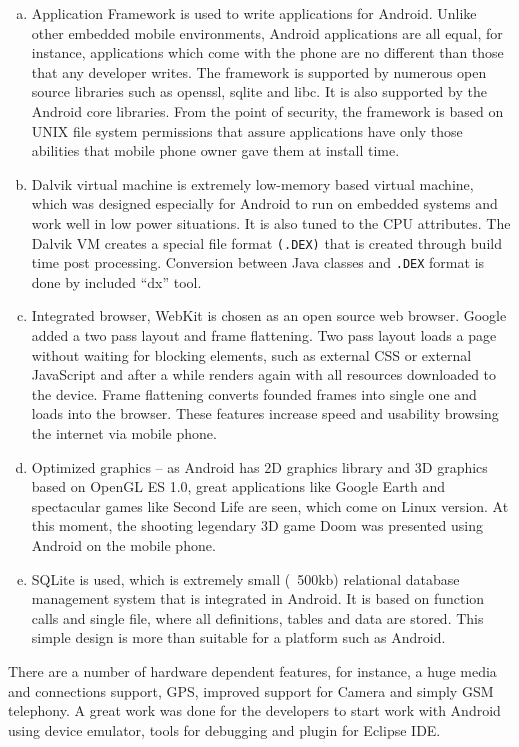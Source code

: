 \begin{enumerate}[a. ]
 \item Application Framework is used to write applications for Android. Unlike other
embedded mobile environments, Android applications are all equal, for instance,
applications which come with the phone are no different than those that any developer
writes. The framework is supported by numerous open source libraries such as
openssl, sqlite and libc. It is also supported by the Android core libraries. From the
point of security, the framework is based on UNIX file system permissions that assure
applications have only those abilities that mobile phone owner gave them at install
time.
 \item Dalvik virtual machine is extremely low-memory based virtual machine, which was
designed especially for Android to run on embedded systems and work well in low
power situations. It is also tuned to the CPU attributes. The Dalvik VM creates a
special file format \texttt{(.DEX)} that is created through build time post processing.
Conversion between Java classes and \texttt{.DEX} format is done by included “dx” tool.
 \item Integrated browser, WebKit is chosen as an open source web browser. Google added
a two pass layout and frame flattening. Two pass layout loads a page without waiting 
for blocking elements, such as external CSS or external JavaScript and after a while
renders again with all resources downloaded to the device. Frame flattening converts
founded frames into single one and loads into the browser. These features increase
speed and usability browsing the internet via mobile phone.
 \item Optimized graphics – as Android has 2D graphics library and 3D graphics based on
OpenGL ES 1.0, great applications like Google Earth and spectacular games like
Second Life are seen, which come on Linux version. At this moment, the shooting
legendary 3D game Doom was presented using Android on the mobile phone.
\item SQLite is used, which is extremely small (~500kb) relational database management
system that is integrated in Android. It is based on function calls and single file,
where all definitions, tables and data are stored. This simple design is more than
suitable for a platform such as Android.
\end{enumerate}
\hspace*{0.82cm}There are a number of hardware dependent features, for instance, a huge media and
connections support, GPS, improved support for Camera and simply GSM telephony. A great
work was done for the developers to start work with Android using device emulator, tools for
debugging and plugin for Eclipse IDE.

